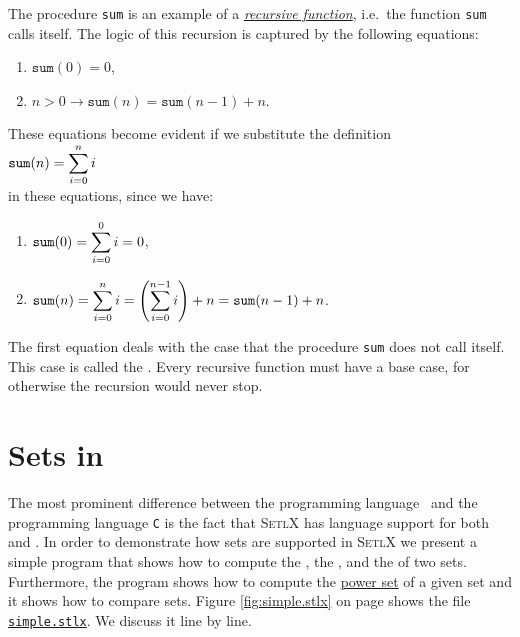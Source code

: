 The procedure \texttt{sum} is an example of a
\href{https://en.wikipedia.org/wiki/Recursion_(computer_science)}{\emph{recursive function}},
i.e.~the function \texttt{sum} calls itself.  The logic of this recursion is captured by the
following equations:
\begin{enumerate}
\item $\texttt{sum}(0) = 0$,
\item $n > 0 \rightarrow \texttt{sum}(n) = \texttt{sum}(n-1) + n$.
\end{enumerate}
These equations become evident if we substitute the definition
\\[0.2cm]
\hspace*{1.3cm}
$\displaystyle \texttt{sum}(n)= \sum\limits_{i=0}^n i$ 
\\[0.2cm]
in these equations, since we have:
\begin{enumerate}
\item $\displaystyle \texttt{sum}(0)= \sum\limits_{i=0}^0 i = 0$,
\item $\displaystyle \texttt{sum}(n)= \sum\limits_{i=0}^n i = \left(\sum\limits_{i=0}^{n-1} i\right) + n = \texttt{sum}(n-1) + n$. 

\end{enumerate}
The first equation deals with the case that the procedure \texttt{sum} does not call itself.  This
case is called the .  Every recursive function must have a base case, for otherwise
the recursion would never stop.


\section{Sets in \setl}
The most prominent difference between the programming language \setl\ and the programming language
\texttt{C} is the fact that  \textsc{SetlX} has language support for both  and .
In order to demonstrate how sets are supported in \textsc{SetlX} we present a simple program that
shows how to compute the , the , and the  of two sets.
Furthermore, the program shows how to compute the \href{https://en.wikipedia.org/wiki/Power_set}{power set} of a
given set and it shows how to compare sets.  Figure \ref{fig:simple.stlx} on page
\pageref{fig:simple.stlx} shows the file
\href{https://github.com/karlstroetmann/Logik/blob/master/SetlX/simple.stlx}{\texttt{simple.stlx}}.  
We discuss it line by line.

